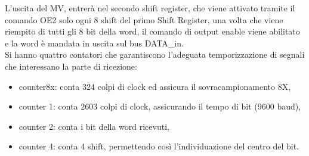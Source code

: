 \documentclass[a4paper, titlepage]{article}
\begin{document}
L'uscita del MV, entrerà nel secondo shift register, che viene attivato tramite il comando OE2 solo ogni 8 shift del primo Shift Register, una volta che viene riempito di tutti gli 8 bit della word, il comando di output enable viene abilitato e la word è mandata in uscita sul bus DATA\_in.\\ Si hanno quattro contatori che garantiscono l'adeguata temporizzazione di segnali che interessano la parte di ricezione:
\begin{itemize}
    \item counter8x: conta 324 colpi di clock ed assicura il sovracampionamento 8X,
    \item counter 1: conta 2603 colpi di clock, assicurando il tempo di bit (9600 baud),
    \item counter 2: conta i bit della word ricevuti,
    \item counter 4: conta 4 shift, permettendo così l'individuazione del centro del bit.
\end{itemize}
\newpage
\end{document}
